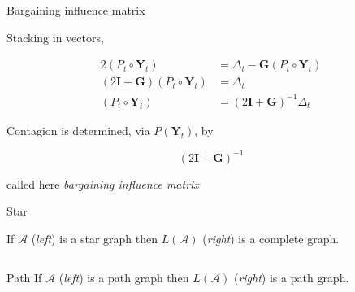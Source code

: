\documentclass{beamer}
\newcommand{\matr}[1]{\bm{#1}}
\newcommand{\Y}{\matr{Y}}
\newcommand{\I}{\matr{I}}
\newcommand{\G}{\matr{G}}
\newcommand{\outdiag}{../thesis/sections/diagrams}
\begin{document}
\begin{frame}{Bargaining influence matrix}

    Stacking in vectors,

    \begin{equation*}
        \begin{split}
            2(P_t \circ \Y_t) &= \Delta_t  - \G \left( P_t \circ \Y_t \right) \\
            (2\I + \G) (P_t \circ \Y_t) &= \Delta_t  \\
            (P_t \circ \Y_t) &= (2\I + \G)^{-1} \Delta_t
        \end{split}
    \end{equation*}

    Contagion is determined, via $P(\Y_t)$, by

    \begin{equation*}
        (2\I + \G)^{-1}
    \end{equation*}

    called here \textit{bargaining influence matrix}

\end{frame}

\begin{frame}{Star}

    If $\mathcal{A}$ (\textit{left}) is a star graph then $L(\mathcal{A})$ (\textit{right}) is a complete graph. \vspace{5mm}

    \begin{columns}[T,onlytextwidth]

        \begin{column}{.46\textwidth}
            \resizebox{\linewidth}{!}{}
        \end{column}

        \hfill

        \begin{column}{.46\textwidth}
            \resizebox{\linewidth}{!}{}
        \end{column}
    \end{columns}
\end{frame}

\begin{frame}{Path}
    If $\mathcal{A}$ (\textit{left}) is a path graph then $L(\mathcal{A})$ (\textit{right}) is a path graph. \vspace{5mm}

    \begin{columns}[T,onlytextwidth]

        \begin{column}{.46\textwidth}
            \resizebox{\linewidth}{!}{}
        \end{column}

        \hfill

        \begin{column}{.46\textwidth}
            \resizebox{\linewidth}{!}{}
        \end{column}
    \end{columns}
\end{frame}
\end{document}
